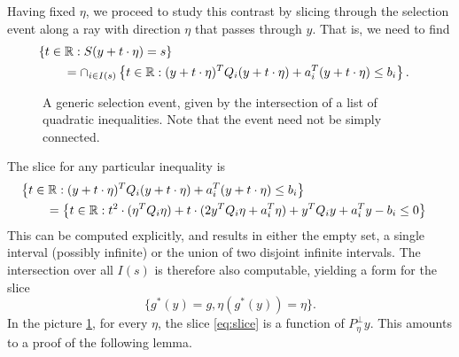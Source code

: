 \documentclass{imsart}
\begin{document}
Having fixed $\eta$, we proceed to study this contrast by slicing through the selection event along a ray with direction $\eta$ that passes through $y$. 
That is, we need to find
$$
\begin{aligned}
\lefteqn{
\left\{t \in \mathbb R : S(y+t \cdot \eta)=s \right\} } \\
 & \qquad = \cap_{i \in I(s)} \left\{t \in \mathbb R : (y+t \cdot \eta)^T Q_i (y+t \cdot \eta) + a_i^T(y+t \cdot \eta) \leq b_i\right\}. \\
\end{aligned}
$$

\begin{figure}
\label{fig:curved}
\begin{center}
\resizebox{!}{3in}{}
\end{center}
A generic selection event, given by the intersection of a list
of quadratic inequalities. Note that the event need not be simply connected. \end{figure}

The slice for any particular inequality is
$$
\begin{aligned}
\lefteqn{
\left\{t \in \mathbb R : (y+t\cdot \eta)^T Q_i (y+t \cdot \eta) + a_i^T(y+t \cdot \eta) \leq b_i\right\}} \\
 & \qquad = \left\{t \in \mathbb R : t^2 \cdot (\eta^TQ_i\eta) + t \cdot(2 y^TQ_i\eta + a_i^T\eta) + y^TQ_iy + a_i^Ty - b_i \leq 0 \right\} \\
\end{aligned}
$$
This can be computed explicitly, and results in either the empty set, a single interval (possibly infinite) or the union of 
two disjoint infinite intervals. The intersection over all $I(s)$ is therefore also computable, yielding a form for the slice
\begin{equation}
\label{eq:slice}
\{g^*(y)=g, \eta(g^*(y))=\eta\}.
\end{equation}
In the picture \ref{fig:curved}, for every $\eta$, the slice \eqref{eq:slice} is a function
of $P_{\eta}^{\perp}y$. This amounts to a proof of the following lemma.
\end{document}
